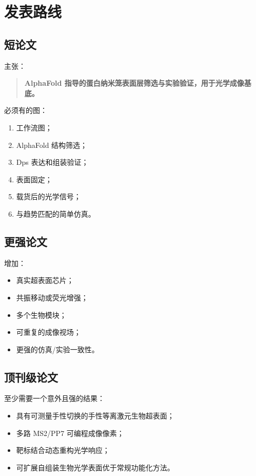 \documentclass[11pt]{ctexart}
\newcommand{\af}{AlphaFold}
\begin{document}
\section{发表路线}

\subsection{短论文}

主张：

\begin{quote}
\textbf{\af{} 指导的蛋白纳米笼表面层筛选与实验验证，用于光学成像基底。}
\end{quote}

必须有的图：

\begin{enumerate}
\item 工作流图；
\item \af{} 结构筛选；
\item Dps 表达和组装验证；
\item 表面固定；
\item 载货后的光学信号；
\item 与趋势匹配的简单仿真。
\end{enumerate}

\subsection{更强论文}

增加：

\begin{itemize}
\item 真实超表面芯片；
\item 共振移动或荧光增强；
\item 多个生物模块；
\item 可重复的成像视场；
\item 更强的仿真/实验一致性。
\end{itemize}

\subsection{顶刊级论文}

至少需要一个意外且强的结果：

\begin{itemize}
\item 具有可测量手性切换的手性等离激元生物超表面；
\item 多路 MS2/PP7 可编程成像像素；
\item 靶标结合动态重构光学响应；
\item 可扩展自组装生物光学表面优于常规功能化方法。
\end{itemize}
\end{document}
